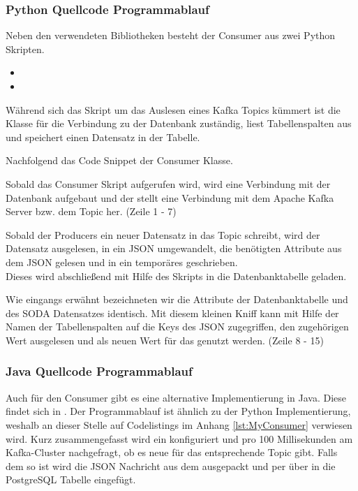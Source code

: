 \subsubsection{Python Quellcode Programmablauf}
Neben den verwendeten Bibliotheken besteht der Consumer aus zwei Python Skripten.

\begin{itemize}
  \item {}
  \item {}
\end{itemize}

Während sich das  Skript um das Auslesen eines Kafka Topics kümmert ist die  Klasse
für die Verbindung zu der Datenbank zuständig, liest Tabellenspalten aus und speichert einen Datensatz in der Tabelle.

Nachfolgend das Code Snippet der Consumer Klasse.



Sobald das Consumer Skript aufgerufen wird, wird eine Verbindung mit der Datenbank
aufgebaut und der  stellt eine Verbindung mit dem Apache Kafka
Server bzw. dem Topic  her.
(Zeile 1 - 7)

Sobald der Producers ein neuer Datensatz in das Topic  schreibt,
wird der Datensatz ausgelesen, in ein \ac{JSON} umgewandelt, die benötigten Attribute aus dem \ac{JSON} gelesen
und in ein temporäres  geschrieben.\\
Dieses  wird abschließend mit Hilfe des  Skripts in die
Datenbanktabelle geladen.

Wie eingangs erwähnt bezeichneten wir die Attribute der Datenbanktabelle und des \ac{SODA} Datensatzes identisch. Mit diesem kleinen \glqq Kniff\grqq{} kann mit Hilfe der Namen der Tabellenspalten
auf die Keys des \ac{JSON} zugegriffen, den zugehörigen Wert ausgelesen und als neuen Wert für das  genutzt werden.
(Zeile 8 - 15)

\subsubsection{Java Quellcode Programmablauf}
Auch für den Consumer gibt es eine alternative Implementierung in Java.
Diese findet sich in .
Der Programmablauf ist ähnlich zu der Python Implementierung, weshalb an dieser Stelle auf Codelistings im Anhang \ref{lst:MyConsumer} verwiesen wird.
Kurz zusammengefasst wird ein  konfiguriert und pro 100 Millisekunden am Kafka-Cluster nachgefragt, ob es neue  für das entsprechende Topic gibt.
Falls dem so ist wird die \ac{JSON} Nachricht aus dem  ausgepackt und per  über  in die PostgreSQL Tabelle eingefügt.
\newpage